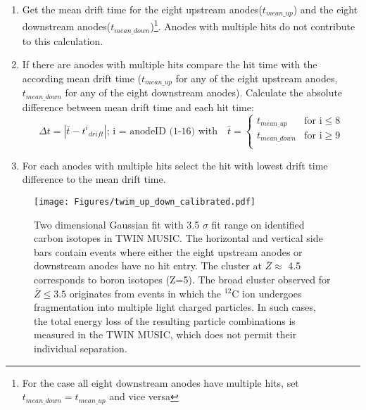 \begin{enumerate}
\itemsep0em
\item Get the mean drift time for the eight upstream anodes($t_{mean\_up}$) and the eight downstream anodes($t_{mean\_down}$)\footnote{For the case all eight downstream anodes have multiple hits, set $t_{mean\_down} = t_{mean\_up}$ and vice versa}. Anodes with multiple hits do not contribute to this calculation.
\item If there are anodes with multiple hits compare the hit time with the according mean drift time ($t_{mean\_up}$ for any of the eight upstream anodes, $t_{mean\_down}$ for any of the eight downstream anodes). Calculate the absolute difference between mean drift time and each hit time:
\begin{equation}
\Delta t = | \bar{t} - {t^i}_{drift}|; \, \text{i = anodeID (1-16) with} \quad \bar{t} = 
\begin{cases}
t_{mean\_up} & \text{for i} \leq 8\\
t_{mean\_down} & \text{for i} \geq 9 \\
\end{cases}
\end{equation}
\item For each anodes with multiple hits select the hit with lowest drift time difference to the mean drift time.
\end{enumerate}
\begin{figure}[htpb]
    \centering
    \texttt{[image: Figures/twim\_up\_down\_calibrated.pdf]}
    \caption{
    Two dimensional Gaussian fit with 3.5 $\sigma$ fit range on identified carbon isotopes in TWIN MUSIC. The horizontal and vertical side bars contain events where either the eight upstream anodes or downstream anodes have no hit entry. The cluster at $\overline{Z} \approx$ 4.5 corresponds to boron isotopes (Z=5). The broad cluster observed for $\overline{Z} \leq 3.5$ originates from events in which the $^{12}$C ion undergoes fragmentation into multiple light charged particles. In such cases, the total energy loss of the resulting particle combinations is measured in the TWIN MUSIC, which does not permit their individual separation. 
    }
    \label{fig:twin_2d_gaus_cut}
\end{figure}

